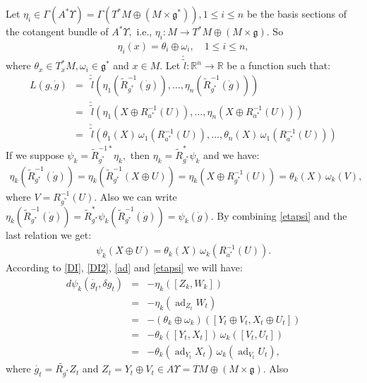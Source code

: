 \documentclass{article}
\begin{document}
Let $\eta_i\in \Gamma(A^*\Upsilon)=\Gamma(T^*M\oplus(M\times {\mathfrak{g}}^*)), 1\leq i\leq n$ be the basis sections of the cotangent bundle of $A^*\Upsilon,$ i.e., $\eta_i: M\to T^*M\oplus (M\times \mathfrak{g}).$ So
\begin{eqnarray}
 \eta_i(x)=\theta_i\oplus \omega_i, \quad 1\leq i\leq n,
\end{eqnarray}
where $\theta_x\in T^*_x M, \omega_i\in \mathfrak{g}^*$ and $x\in M.$ Let $\hat{\tilde{l}}: \mathbb{R}^n\to \mathbb{R}$ be a function such that:
\begin{eqnarray}
L(g, \dot{g})&=&\hat{\tilde{l}}(\eta_1(\tilde{R}^{-1}_{g^*}(\dot{g})), \ldots, \eta_n(\tilde{R}^{-1}_{g^*}(\dot{g})))\\ \nonumber
&=&\hat{\tilde{l}}(\eta_1(X\oplus R^{-1}_{a^*}(U)), \ldots, \eta_n(X\oplus R^{-1}_{a^*}(U)))\\ \nonumber 
&=&\hat{\tilde{l}}(\theta_1(X)\,\omega_1( R^{-1}_{a^*}(U)), \ldots, \theta_n(X)\,\omega_1( R^{-1}_{a^*}(U)))
\end{eqnarray}
If we suppose $\psi_k=\tilde{R}^{-1*}_{g^*}\eta_k,$ then $\eta_k=\tilde{R}^{*}_{g^*}\psi_k$ and we have:
\begin{eqnarray}\label{etapsi}
\eta_k(\tilde{R}^{-1}_{g^*}(\dot{g}))=\eta_k(\tilde{R}^{-1}_{g^*}(X\oplus U))=\eta_k(X\oplus {R}^{-1}_{g^*}(U))=\theta_k(X)\,\omega_k(V),
\end{eqnarray}
where $V={R}^{-1}_{g^*}(U).$ Also we can write $\eta_k(\tilde{R}^{-1}_{g^*}(\dot{g}))= \tilde{R}^*_{g^*}\psi_k(\tilde{R}^{-1}_{g^*}(\dot{g}))= \psi_k(\dot{g}).$
By combining \ref{etapsi} and the last relation we get:
\begin{eqnarray}
\psi_k(X\oplus U)=\theta_k(X)\,\omega_k({R}^{-1}_{a^*}(U)).
\end{eqnarray}
According to \ref{DI}, \ref{DI2}, \ref{ad} and \ref{etapsi} we will have:
\begin{eqnarray}\label{Ead}
d\psi_k(\dot{g_t}, \delta g_t)&=&-\eta_k([Z_k, W_k])\\ \nonumber
&=&-\eta_k(\operatorname{ad}_{Z_t}W_t)\\ \nonumber
  &=&  -(\theta_k\oplus \omega_k)([Y_t\oplus V_t, X_t\oplus U_t])\\ \nonumber
  &=& -\theta_k([Y_t, X_t])\,\omega_k([V_t, U_t])\\ \nonumber 
  &=&-\theta_k(\operatorname{ad}_{Y_t}X_t)\,\omega_k(\operatorname{ad}_{V_t}U_t),                               
\end{eqnarray}
where $\dot{g_t}=\tilde{R_{g^*}}Z_t$ and $Z_t=Y_t\oplus V_t \in A\Upsilon= TM\oplus (M\times \mathfrak{g}).$ Also 
\end{document}
